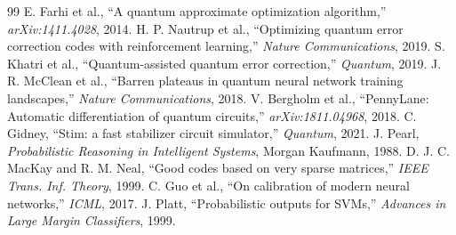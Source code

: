\documentclass[journal,twocolumn]{IEEEtran}
\begin{document}
\begin{thebibliography}{99}
 E. Farhi et al., ``A quantum approximate optimization algorithm,'' \textit{arXiv:1411.4028}, 2014.
 H. P. Nautrup et al., ``Optimizing quantum error correction codes with reinforcement learning,'' \textit{Nature Communications}, 2019.
 S. Khatri et al., ``Quantum-assisted quantum error correction,'' \textit{Quantum}, 2019.
 J. R. McClean et al., ``Barren plateaus in quantum neural network training landscapes,'' \textit{Nature Communications}, 2018.
 V. Bergholm et al., ``PennyLane: Automatic differentiation of quantum circuits,'' \textit{arXiv:1811.04968}, 2018.
 C. Gidney, ``Stim: a fast stabilizer circuit simulator,'' \textit{Quantum}, 2021.
 J. Pearl, \textit{Probabilistic Reasoning in Intelligent Systems}, Morgan Kaufmann, 1988.
 D. J. C. MacKay and R. M. Neal, ``Good codes based on very sparse matrices,'' \textit{IEEE Trans. Inf. Theory}, 1999.
 C. Guo et al., ``On calibration of modern neural networks,'' \textit{ICML}, 2017.
 J. Platt, ``Probabilistic outputs for SVMs,'' \textit{Advances in Large Margin Classifiers}, 1999.
\end{thebibliography}
\end{document}
